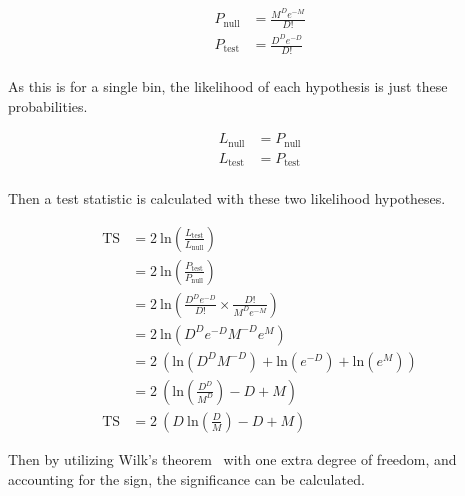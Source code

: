   \begin{equation}\label{eqn:sig_hypo}
    \begin{split}
      P_{\textrm{null}} & = \frac{M^{D} e^{-M}}{D!} \\
      P_{\textrm{test}} & = \frac{D^{D} e^{-D}}{D!} \\
    \end{split}
  \end{equation}
  
  As this is for a single bin, the likelihood of each hypothesis is just these probabilities.
  
  \begin{equation}
    \begin{split}
      L_{\textrm{null}} & = P_{\textrm{null}} \\
      L_{\textrm{test}} & = P_{\textrm{test}} \\
    \end{split}
  \end{equation}
  
  Then a test statistic is calculated with these two likelihood hypotheses.

  \begin{equation}
    \begin{split}
      \textrm{TS} & = 2 \: \textrm{ln} \left ( \frac{ L_{\textrm{test}} }{ L_{\textrm{null}}    } \right ) \\
                  & = 2 \: \textrm{ln} \left ( \frac{ P_{\textrm{test}} }{ P_{\textrm{null}}    } \right ) \\
                  & = 2 \: \textrm{ln} \left ( \frac{D^D e^{-D}}{D!} \times \frac{D!}{M^D e^{-M}} \right ) \\
                  & = 2 \: \textrm{ln} \left ( D^D e^{-D} M^{-D} e^M                              \right ) \\
                  & = 2 \: \left (      \textrm{ln} \left ( D^D M^{-D} \right ) + \textrm{ln} \left ( e^{-D} \right ) + \textrm{ln} \left ( e^M  \right )\right ) \\
                  & = 2 \: \left (      \textrm{ln} \left (  \frac{D^D}{M^D} \right ) -D + M \right ) \\
      \textrm{TS} & = 2 \: \left ( D \: \textrm{ln} \left (  \frac{D  }{M  } \right ) -D + M \right )
    \end{split}
  \end{equation}
  
  Then by utilizing Wilk's theorem~\cite{wilks1938} with one extra degree of freedom, and accounting for the sign, the significance can be calculated.
    

